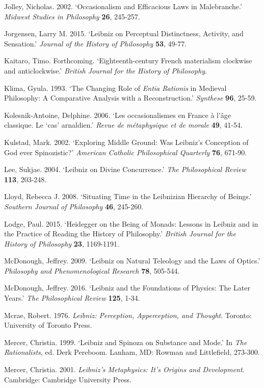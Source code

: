 \documentclass{article}
\begin{document}
Jolley, Nicholas. 2002. `Occasionalism and Efficacious Laws in
Malebranche.' \emph{Midwest Studies in Philosophy} \textbf{26}, 245-257.

Jorgensen, Larry M. 2015. `Leibniz on Perceptual Distinctness, Activity,
and Sensation.' \emph{Journal of the History of Philosophy} \textbf{53},
49-77.

Kaitaro, Timo. Forthcoming. `Eighteenth-century French materialism
clockwise and anticlockwise.' \emph{British Journal for the History of
Philosophy}.

Klima, Gyula. 1993. `The Changing Role of \emph{Entia Rationis} in
Medieval Philosophy: A Comparative Analysis with a Reconstruction.'
\emph{Synthese} \textbf{96}, 25-59.

Kolesnik-Antoine, Delphine. 2006. `Les occasionalismes en France à l'âge
classique. Le `cas' arnaldien.' \emph{Revue de métaphysique et de
morale} \textbf{49}, 41-54.

Kulstad, Mark. 2002. `Exploring Middle Ground: Was Leibniz's Conception
of God ever Spinozistic?' \emph{American Catholic Philosophical
Quarterly} \textbf{76}, 671-90.

Lee, Sukjae. 2004. `Leibniz on Divine Concurrence.' \emph{The
Philosophical Review} \textbf{113}, 203-248.

Lloyd, Rebecca J. 2008. `Situating Time in the Leibnizian Hierarchy of
Beings.' \emph{Southern Journal of Philosophy} \textbf{46}, 245-260.

Lodge, Paul. 2015. `Heidegger on the Being of Monads: Lessons in Leibniz
and in the Practice of Reading the History of Philosophy.' \emph{British
Journal for the History of Philosophy} \textbf{23}, 1169-1191.

McDonough, Jeffrey. 2009. `Leibniz on Natural Teleology and the Laws of
Optics.' \emph{Philosophy and Phenomenological Research} \textbf{78},
505-544.

McDonough, Jeffrey. 2016. `Leibniz and the Foundations of Physics: The
Later Years.' \emph{The Philosophical Review} \textbf{125}, 1-34.

Mcrae, Robert. 1976. \emph{Leibniz: Perception, Apperception, and
Thought}. Toronto: University of Toronto Press.

Mercer, Christia. 1999. `Leibniz and Spinoza on Substance and Mode.' In
\emph{The Rationalists}, ed. Derk Pereboom. Lanham, MD: Rowman and
Littlefield, 273-300.

Mercer, Christia. 2001. \emph{Leibniz's Metaphysics: It's Origins and
Development}. Cambridge: Cambridge University Press.
\end{document}
